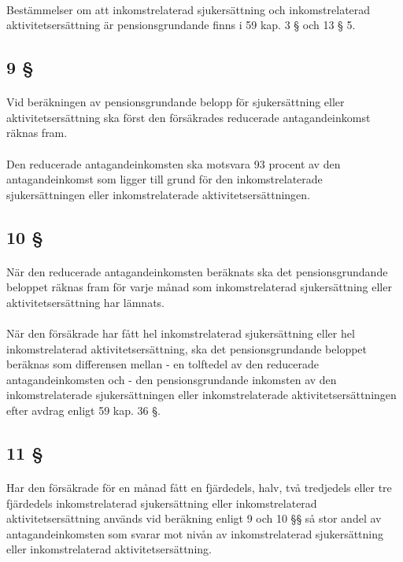 \documentclass[a4paper,notitlepage,openany,10pt]{book}
\begin{document}
\paragraph*{}
Bestämmelser om att inkomstrelaterad sjukersättning och inkomstrelaterad aktivitetsersättning är pensionsgrundande finns i 59 kap. 3 § och 13 § 5.
\subsection*{9 §}
\paragraph*{}
Vid beräkningen av pensionsgrundande belopp för sjukersättning eller aktivitetsersättning ska först den försäkrades reducerade antagandeinkomst räknas fram.
\paragraph*{}
Den reducerade antagandeinkomsten ska motsvara 93 procent av den antagandeinkomst som ligger till grund för den inkomstrelaterade sjukersättningen eller inkomstrelaterade aktivitetsersättningen.
\subsection*{10 §}
\paragraph*{}
När den reducerade antagandeinkomsten beräknats ska det pensionsgrundande beloppet räknas fram för varje månad som inkomstrelaterad sjukersättning eller aktivitetsersättning har lämnats.
\paragraph*{}
När den försäkrade har fått hel inkomstrelaterad sjukersättning eller hel inkomstrelaterad aktivitetsersättning, ska det pensionsgrundande beloppet beräknas som differensen mellan
\newline - en tolftedel av den reducerade antagandeinkomsten och
\newline - den pensionsgrundande inkomsten av den inkomstrelaterade sjukersättningen eller inkomstrelaterade aktivitetsersättningen efter avdrag enligt 59 kap. 36 §.
\subsection*{11 §}
\paragraph*{}
Har den försäkrade för en månad fått en fjärdedels, halv, två tredjedels eller tre fjärdedels inkomstrelaterad sjukersättning eller inkomstrelaterad aktivitetsersättning används vid beräkning enligt 9 och 10 §§ så stor andel av antagandeinkomsten som svarar mot nivån av inkomstrelaterad sjukersättning eller inkomstrelaterad aktivitetsersättning.
\end{document}
